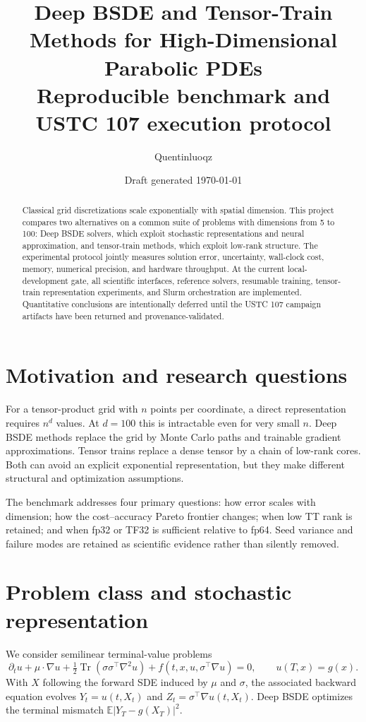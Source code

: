 \documentclass[11pt]{article}
\title{Deep BSDE and Tensor-Train Methods for High-Dimensional Parabolic PDEs\\
\large Reproducible benchmark and USTC 107 execution protocol}
\author{Quentinluoqz}
\date{Draft generated \today}
\begin{document}
\maketitle

\begin{abstract}
Classical grid discretizations scale exponentially with spatial dimension. This project
compares two alternatives on a common suite of problems with dimensions from 5 to 100:
Deep BSDE solvers, which exploit stochastic representations and neural approximation,
and tensor-train methods, which exploit low-rank structure. The experimental protocol
jointly measures solution error, uncertainty, wall-clock cost, memory, numerical precision,
and hardware throughput. At the current local-development gate, all scientific interfaces,
reference solvers, resumable training, tensor-train representation experiments, and Slurm
orchestration are implemented. Quantitative conclusions are intentionally deferred until
the USTC 107 campaign artifacts have been returned and provenance-validated.
\end{abstract}

\section{Motivation and research questions}
For a tensor-product grid with $n$ points per coordinate, a direct representation requires
$n^d$ values. At $d=100$ this is intractable even for very small $n$. Deep BSDE methods
replace the grid by Monte Carlo paths and trainable gradient approximations. Tensor trains
replace a dense tensor by a chain of low-rank cores. Both can avoid an explicit exponential
representation, but they make different structural and optimization assumptions.

The benchmark addresses four primary questions: how error scales with dimension; how the
cost--accuracy Pareto frontier changes; when low TT rank is retained; and when fp32 or TF32
is sufficient relative to fp64. Seed variance and failure modes are retained as scientific
evidence rather than silently removed.

\section{Problem class and stochastic representation}
We consider semilinear terminal-value problems
\begin{equation}
  \partial_t u + \mu\!\cdot\!\nabla u
  + \tfrac12\operatorname{Tr}(\sigma\sigma^\top\nabla^2u)
  + f(t,x,u,\sigma^\top\nabla u)=0,\qquad u(T,x)=g(x).
\end{equation}
With $X$ following the forward SDE induced by $\mu$ and $\sigma$, the associated backward
equation evolves $Y_t=u(t,X_t)$ and $Z_t=\sigma^\top\nabla u(t,X_t)$. Deep BSDE optimizes
the terminal mismatch $\mathbb{E}|Y_T-g(X_T)|^2$.
\end{document}
